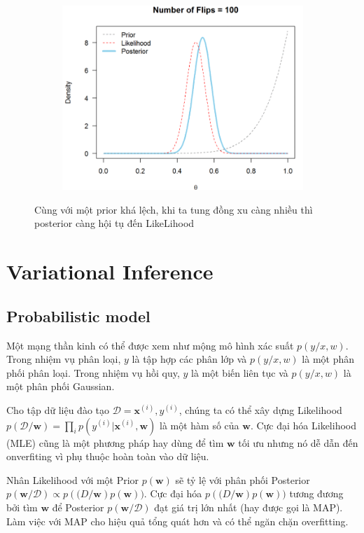 \begin{figure}[h]
\begin{subfigure}{.5\textwidth}
	\label{fig:sfig1}
	\end{subfigure}
	\begin{subfigure}{.5\textwidth}
	\centering
	\includegraphics[width=.8\linewidth]{Chuong3/Figs/100.png}
	\label{fig:sfig1}
	\end{subfigure}
	\label{fig:su anh huong cua prior sai}
	\caption{Cùng với một prior khá lệch, khi ta tung đồng xu càng nhiều thì posterior càng hội tụ đến LikeLihood}
\end{figure}


\section{Variational Inference}
\subsection{Probabilistic model}
Một mạng thần kinh có thể được xem như mộng mô hình xác suất $p(y/x,w)$. Trong nhiệm vụ phân loại, $y$ là tập hợp các phân lớp và  $p(y/x,w)$ là một phân phối phân loại. Trong nhiệm vụ hồi quy, $y$ là một biến liên tục và  $p(y/x,w)$ là một phân phối Gaussian.

Cho tập dữ liệu đào tạo $\mathcal{D}={\textbf{x}^{(i)},y^{(i)}}$, chúng ta có thể xây dựng Likelihood $p(\mathcal{D}/\textbf{w}) = \prod_{i}p(y^{(i)}|\textbf{x}^{(i)},\textbf{w})$ là một hàm số của $\textbf{w}$. Cực đại hóa Likelihood (MLE) cũng là một phương pháp hay dùng để tìm $\textbf{w}$ tối ưu nhưng nó dễ dẫn đến onverfiting vì phụ thuộc hoàn toàn vào dữ liệu.

Nhân Likelihood với một Prior $p(\textbf{w})$ sẽ tỷ lệ với phân phối Posterior $p(\textbf{w}/\mathcal{D}) \propto p(\mathcal(D/\textbf{w})p(\textbf{w}))$. Cực đại hóa $p(\mathcal(D/\textbf{w})p(\textbf{w}))$ tương đương bởi tìm $\textbf{w}$ để Posterior $p(\textbf{w}/\mathcal{D})$ đạt giá trị lớn nhất (hay được gọi là MAP). Làm việc với MAP cho hiệu quả tổng quát hơn và có thể ngăn chặn overfitting.

